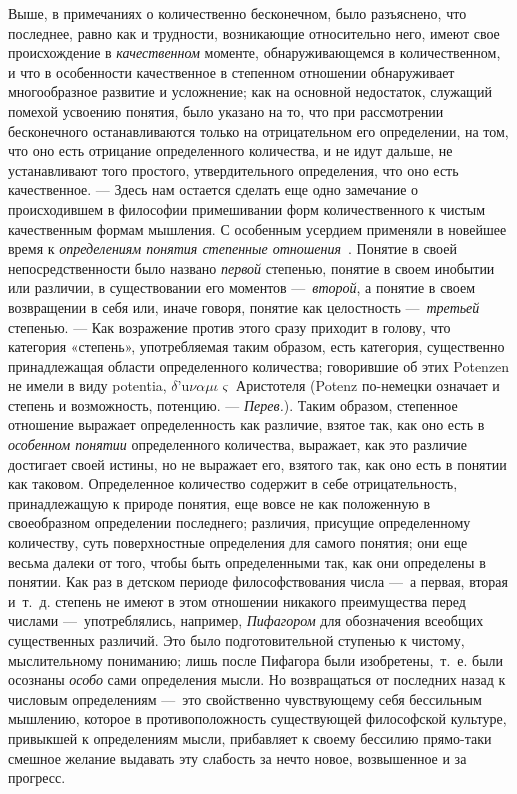Выше, в примечаниях о количественно бесконечном, было разъяснено, что
последнее, равно как и трудности, возникающие относительно него, имеют свое
происхождение в {\em качественном} моменте,
обнаруживающемся в количественном, и что в особенности качественное в
степенном отношении обнаруживает многообразное развитие и усложнение; как
на основной недостаток, служащий помехой усвоению понятия, было указано на
то, что при рассмотрении бесконечного останавливаются только на
отрицательном его определении, на том, что оно есть отрицание определенного
количества, и не идут дальше, не устанавливают того простого,
утвердительного определения, что оно есть качественное. — Здесь нам
остается сделать еще одно замечание о происходившем в философии
примешивании форм количественного к чистым качественным формам мышления. С
особенным усердием применяли в новейшее время к
{\em определениям понятия степенные
отношения}~\label{bkm:Ref474666566}.
Понятие в своей непосредственности было названо
{\em первой} степенью, понятие в своем инобытии или
различии, в существовании его моментов —~{\em второй},
а понятие в своем возвращении в себя или, иначе говоря, понятие как
целостность —~{\em третьей} степенью. — Как возражение
против этого сразу приходит в голову, что категория «степень»,
употребляемая таким образом, есть категория, существенно принадлежащая
области определенного количества; говорившие об этих Potenzen не имели в
виду potentia, $\delta \text{'u} \nu \alpha \mu \iota \varsigma
$ Аристотеля (Potenz по-немецки означает и степень и возможность, потенцию.
— {\em Перев.}). Таким образом, степенное отношение выражает
определенность как различие, взятое так, как оно есть в
{\em особенном понятии} определенного количества,
выражает, как это различие достигает своей истины, но не выражает его,
взятого так, как оно есть в понятии как таковом. Определенное количество
содержит в себе отрицательность, принадлежащую к природе понятия, еще вовсе
не как положенную в своеобразном определении последнего; различия, присущие
определенному количеству, суть поверхностные определения для самого
понятия; они еще весьма далеки от того, чтобы быть определенными так, как
они определены в понятии. Как раз в детском периоде философствования числа
—~а первая, вторая и~т.~д. степень не имеют в этом отношении никакого
преимущества перед числами —~употреблялись, например,
{\em Пифагором} для обозначения всеобщих существенных
различий. Это было подготовительной ступенью к чистому, мыслительному
пониманию; лишь после Пифагора были изобретены,~т.~е. были осознаны
{\em особо} сами определения мысли. Но возвращаться от
последних назад к числовым определениям —~это свойственно чувствующему себя
бессильным мышлению, которое в противоположность существующей философской
культуре, привыкшей к определениям мысли, прибавляет к своему бессилию
прямо-таки смешное желание выдавать эту слабость за нечто новое,
возвышенное и за прогресс.

